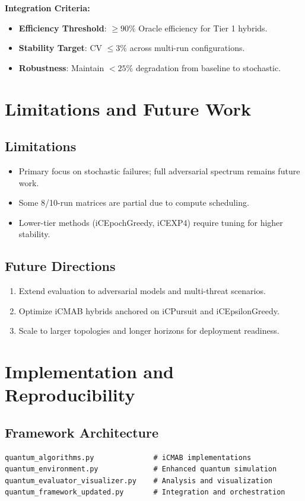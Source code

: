 \documentclass[12pt,a4paper]{article}
\begin{document}
\textbf{Integration Criteria:}
\begin{itemize}
\item \textbf{Efficiency Threshold}: \(\geq 90\%\) Oracle efficiency for Tier 1 hybrids.
\item \textbf{Stability Target}: CV \(\leq 3\%\) across multi-run configurations.
\item \textbf{Robustness}: Maintain \(<25\%\) degradation from baseline to stochastic.
\end{itemize}

\section{Limitations and Future Work}

\subsection{Limitations}
\begin{itemize}
\item Primary focus on stochastic failures; full adversarial spectrum remains future work.
\item Some 8/10-run matrices are partial due to compute scheduling.
\item Lower-tier methods (iCEpochGreedy, iCEXP4) require tuning for higher stability.
\end{itemize}

\subsection{Future Directions}
\begin{enumerate}
\item Extend evaluation to adversarial models and multi-threat scenarios.
\item Optimize iCMAB hybrids anchored on iCPursuit and iCEpsilonGreedy.
\item Scale to larger topologies and longer horizons for deployment readiness.
\end{enumerate}

\section{Implementation and Reproducibility}

\subsection{Framework Architecture}
\begin{lstlisting}[caption=Core iCMAB Components]
quantum_algorithms.py              # iCMAB implementations
quantum_environment.py             # Enhanced quantum simulation
quantum_evaluator_visualizer.py    # Analysis and visualization
quantum_framework_updated.py       # Integration and orchestration
\end{lstlisting}
\end{document}
